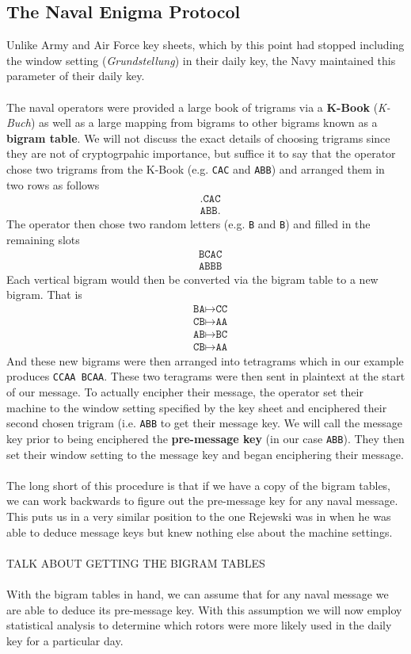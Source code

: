 \subsection{The Naval Enigma Protocol}
Unlike Army and Air Force key sheets, which by this point had stopped
including the window setting (\emph{Grundstellung}) in their daily
key, the Navy maintained this parameter of their daily key.
\\\\The naval operators were provided a large book of trigrams via a
	{\bf{{K-Book}}} (\emph{K-Buch}) as well as a large mapping from
bigrams to other bigrams known as a {\bf{bigram table}}. We will not
discuss the exact details of choosing trigrams since they are not of
cryptogrpahic importance, but suffice it to say that the operator
chose two trigrams from the K-Book (e.g. \texttt{CAC} and
\texttt{ABB}) and arranged them in two rows as follows
\begin{align*}
	 & \texttt{.CAC} \\
	 & \texttt{ABB.}
\end{align*}
The operator then chose two random letters (e.g. \texttt{B} and
\texttt{B}) and filled in the remaining slots
\begin{align*}
	 & \texttt{BCAC} \\
	 & \texttt{ABBB}
\end{align*}
Each vertical bigram would then be converted via the bigram table to
a new bigram. That is
\begin{align*}
	 & \texttt{BA} \mapsto \texttt{CC} \\
	 & \texttt{CB} \mapsto \texttt{AA} \\
	 & \texttt{AB} \mapsto \texttt{BC} \\
	 & \texttt{CB} \mapsto \texttt{AA}
\end{align*}
And these new bigrams were then arranged into tetragrams which in our
example produces \texttt{CCAA BCAA}. These two teragrams were then
sent in plaintext at the start of our message. To actually encipher
their message, the operator set their machine to the window setting
specified by the key sheet and enciphered their second chosen trigram
(i.e. \texttt{ABB} to get their message key. We will call the message
key prior to being enciphered the {\bf{pre-message key}} (in our
case \texttt{ABB}). They then set their window setting to the
message key and began enciphering their message.
\\\\The long short of this procedure is that if we have a copy of
the bigram tables, we can work backwards to figure out the
pre-message key for any naval message. This puts us in a very
similar position to the one Rejewski was in when he was able to
deduce message keys but knew nothing else about the machine settings.
\\\\TALK ABOUT GETTING THE BIGRAM TABLES
\\\\With the bigram tables in hand, we can assume that for any
naval message we are able to deduce its pre-message key. With this
assumption we will now employ statistical analysis to determine
which rotors were more likely used in the daily key for a particular day.

